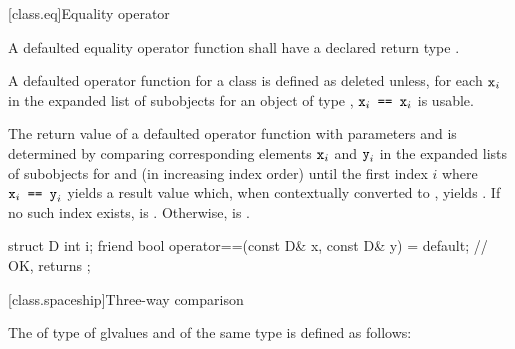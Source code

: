 [class.eq]{Equality operator}
%

\pnum
A defaulted equality operator function
shall have a declared return type .

\pnum
A defaulted \tcode{==} operator function for a class 
is defined as deleted
unless, for each $\texttt{x}_i$ in the expanded list of subobjects
for an object  of type ,
$\texttt{x}_i\texttt{ == }\texttt{x}_i$
is usable.

\pnum
The return value  of a defaulted \tcode{==} operator function
with parameters  and  is determined
by comparing corresponding elements $\texttt{x}_i$ and $\texttt{y}_i$
in the expanded lists of subobjects for  and 
(in increasing index order)
until the first index $i$
where $\texttt{x}_i\texttt{ == }\texttt{y}_i$ yields a result value which,
when contextually converted to , yields .
If no such index exists,  is .
Otherwise,  is .

\pnum
\begin{example}
\begin{codeblock}
struct D {
  int i;
  friend bool operator==(const D& x, const D& y) = default;
                                                // OK, returns 
};
\end{codeblock}
\end{example}

[class.spaceship]{Three-way comparison}
%

\pnum
The 
of type 
of glvalues  and  of the same type
is defined as follows:

